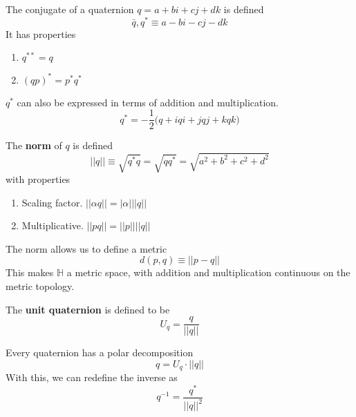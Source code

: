   \begin{definition}
    The conjugate of a quaternion $q = a + bi + cj + dk$ is defined 
    \begin{equation}
      \bar{q}, q^* \equiv a - bi - cj - dk
    \end{equation}
    It has properties
    \begin{enumerate}
      \item $q^{**} = q$
      \item $(q p)^* = p^* q^*$
    \end{enumerate}
    $q^*$ can also be expressed in terms of addition and multiplication. 
    \begin{equation}
      q^* = -\frac{1}{2} \big( q + iqi + jqj + kqk \big)
    \end{equation}
  \end{definition}

  \begin{definition}
    The \textbf{norm} of $q$ is defined
    \begin{equation}
      ||q|| \equiv \sqrt{q^* q} = \sqrt{q q^*} = \sqrt{a^2 + b^2 + c^2 + d^2}
    \end{equation}
    with properties
    \begin{enumerate}
      \item Scaling factor. $||\alpha q|| = |\alpha| ||q||$
      \item Multiplicative. $||p q|| = ||p|| ||q||$
    \end{enumerate}
  \end{definition}

  The norm allows us to define a metric 
  \begin{equation}
    d(p, q) \equiv ||p - q||
  \end{equation}
  This makes $\mathbb{H}$ a metric space, with addition and multiplication continuous on the metric topology. 

  \begin{definition}
    The \textbf{unit quaternion} is defined to be
    \begin{equation}
      U_q = \frac{q}{||q||}
    \end{equation}
  \end{definition}

  \begin{corollary}
    Every quaternion has a polar decomposition
    \begin{equation}
      q = U_q \cdot ||q||
    \end{equation}
    With this, we can redefine the inverse as
    \begin{equation}
      q^{-1} = \frac{q^*}{||q||^2}
    \end{equation}
  \end{corollary}

